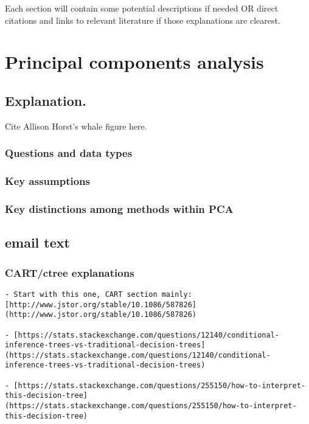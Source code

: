 \documentclass[
]{book}
\begin{document}
Each section will contain some potential descriptions if needed OR direct citations and links to relevant literature if those explanations are clearest.

\hypertarget{principal-components-analysis}{%
\chapter*{Principal components analysis}\label{principal-components-analysis}}

\hypertarget{explanation.}{%
\section{Explanation.}\label{explanation.}}

Cite Allison Horst's whale figure here.

\hypertarget{questions-and-data-types}{%
\subsection{Questions and data types}\label{questions-and-data-types}}

\hypertarget{key-assumptions}{%
\subsection{Key assumptions}\label{key-assumptions}}

\hypertarget{key-distinctions-among-methods-within-pca}{%
\subsection{Key distinctions among methods within PCA}\label{key-distinctions-among-methods-within-pca}}

\hypertarget{email-text}{%
\section{email text}\label{email-text}}

\hypertarget{cartctree-explanations}{%
\subsection{CART/ctree explanations}\label{cartctree-explanations}}

\begin{verbatim}
- Start with this one, CART section mainly: [http://www.jstor.org/stable/10.1086/587826](http://www.jstor.org/stable/10.1086/587826)
    
- [https://stats.stackexchange.com/questions/12140/conditional-inference-trees-vs-traditional-decision-trees](https://stats.stackexchange.com/questions/12140/conditional-inference-trees-vs-traditional-decision-trees)
    
- [https://stats.stackexchange.com/questions/255150/how-to-interpret-this-decision-tree](https://stats.stackexchange.com/questions/255150/how-to-interpret-this-decision-tree)
    
\end{verbatim}
\end{document}
